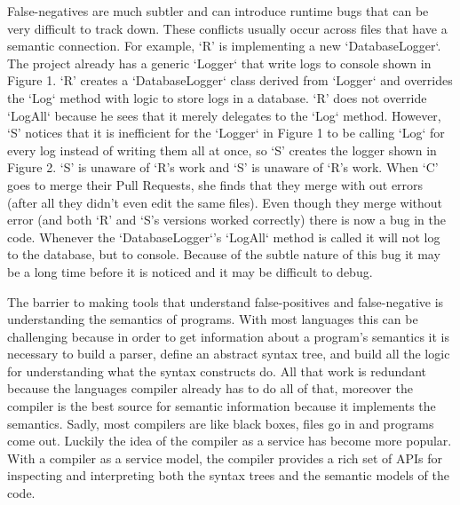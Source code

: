 \documentclass[10pt,draftclsnofoot,onecolumn]{IEEEtran}
\begin{document}
False-negatives are much subtler and can introduce runtime bugs that can be very difficult to track down. These conflicts usually occur across files that have a semantic connection. For example, ‘R’ is implementing a new `DatabaseLogger`. The project already has a generic `Logger` that write logs to console shown in Figure 1. ‘R’ creates a `DatabaseLogger` class derived from `Logger` and overrides the `Log` method with logic to store logs in a database. ‘R’ does not override `LogAll` because he sees that it merely delegates to the `Log` method. However, ‘S’ notices that it is inefficient for the `Logger` in Figure 1 to be calling `Log` for every log instead of writing them all at once, so ‘S’ creates the logger shown in Figure 2. ‘S’ is unaware of ‘R’s work and ‘S’ is unaware of ‘R’s work. When ‘C’ goes to merge their Pull Requests, she finds that they merge with out errors (after all they didn’t even edit the same files). Even though they merge without error (and both ‘R’ and ‘S’s versions worked correctly) there is now a bug in the code. Whenever the `DatabaseLogger`’s `LogAll` method is called it will not log to the database, but to console. Because of the subtle nature of this bug it may be a long time before it is noticed and it may be difficult to debug.

The barrier to making tools that understand false-positives and false-negative is understanding the semantics of programs. With most languages this can be challenging because in order to get information about a program’s semantics it is necessary to build a parser, define an abstract syntax tree, and build all the logic for understanding what the syntax constructs do. All that work is redundant because the languages compiler already has to do all of that, moreover the compiler is the best source for semantic information because it implements the semantics. Sadly, most compilers are like black boxes, files go in and programs come out. Luckily the idea of the compiler as a service has become more popular. With a compiler as a service model, the compiler provides a rich set of APIs for inspecting and interpreting both the syntax trees and the semantic models of the code.
\end{document}
